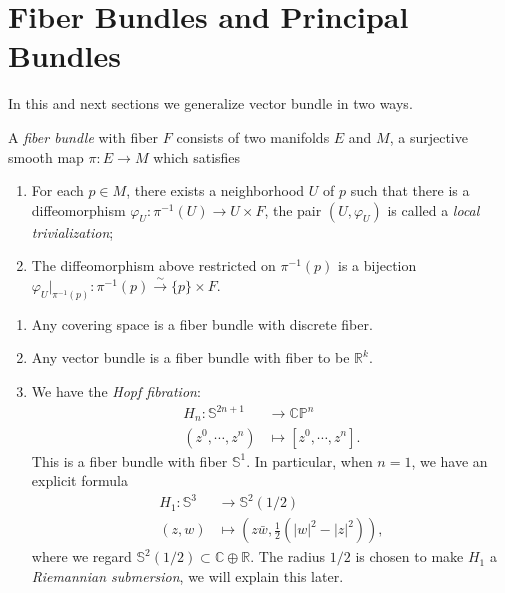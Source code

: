 \section{Fiber Bundles and Principal Bundles}

In this and next sections we generalize vector bundle in two ways.

\begin{defn}
    A \emph{fiber bundle} with fiber $F$ consists of two manifolds $E$ and $M$, a surjective smooth map $\pi:E\to M$ which satisfies
    \begin{enumerate}[(1)]
        \item For each $p\in M$, there exists a neighborhood $U$ of $p$ such that there is a diffeomorphism $\varphi_U:\pi^{-1}(U)\to U\times F$, the pair $(U,\varphi_U)$ is called a \emph{local trivialization};
        \item The diffeomorphism above restricted on $\pi^{-1}(p)$ is a bijection $\varphi_U|_{\pi^{-1}(p)}:\pi^{-1}(p)\xrightarrow{\sim}\{p\}\times F$.
    \end{enumerate}
\end{defn}

\begin{eg}
    \begin{enumerate}[(1)]
        \item Any covering space is a fiber bundle with discrete fiber.
        \item Any vector bundle is a fiber bundle with fiber to be $\mathbb{R}^k$.
        \item We have the \emph{Hopf fibration}:
        \begin{align*}
            H_n:\mathbb{S}^{2n+1}&\to\mathbb{CP}^n\\
            (z^0,\cdots,z^n)&\mapsto[z^0,\cdots,z^n].
        \end{align*}
        This is a fiber bundle with fiber $\mathbb{S}^1$.
        In particular, when $n=1$, we have an explicit formula
        \begin{align*}
            H_1:\mathbb{S}^3&\to\mathbb{S}^2(1/2)\\
            (z,w)&\mapsto\left(z\bar{w},\frac{1}{2}\left(|w|^2-|z|^2\right)\right),
        \end{align*}
        where we regard $\mathbb{S}^2(1/2)\subset\mathbb{C}\oplus\mathbb{R}$.
        The radius $1/2$ is chosen to make $H_1$ a \emph{Riemannian submersion}, we will explain this later.
    \end{enumerate}
\end{eg}